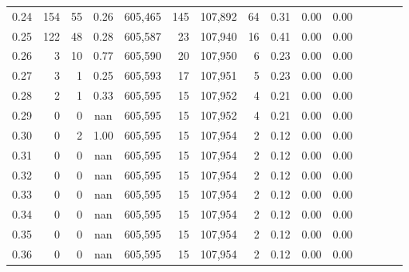 \begin{tabular}{rrrcrrrrrrrrrrr}
0.24 &      154 &      55 &                                       0.26 &  605,465 &      145 &  107,892 &       64 &  0.31 &  0.00 &                         0.00 \\
0.25 &      122 &      48 &                                       0.28 &  605,587 &       23 &  107,940 &       16 &  0.41 &  0.00 &                         0.00 \\
0.26 &        3 &      10 &                                       0.77 &  605,590 &       20 &  107,950 &        6 &  0.23 &  0.00 &                         0.00 \\
0.27 &        3 &       1 &                                       0.25 &  605,593 &       17 &  107,951 &        5 &  0.23 &  0.00 &                         0.00 \\
0.28 &        2 &       1 &                                       0.33 &  605,595 &       15 &  107,952 &        4 &  0.21 &  0.00 &                         0.00 \\
0.29 &        0 &       0 &                                        nan &  605,595 &       15 &  107,952 &        4 &  0.21 &  0.00 &                         0.00 \\
0.30 &        0 &       2 &                                       1.00 &  605,595 &       15 &  107,954 &        2 &  0.12 &  0.00 &                         0.00 \\
0.31 &        0 &       0 &                                        nan &  605,595 &       15 &  107,954 &        2 &  0.12 &  0.00 &                         0.00 \\
0.32 &        0 &       0 &                                        nan &  605,595 &       15 &  107,954 &        2 &  0.12 &  0.00 &                         0.00 \\
0.33 &        0 &       0 &                                        nan &  605,595 &       15 &  107,954 &        2 &  0.12 &  0.00 &                         0.00 \\
0.34 &        0 &       0 &                                        nan &  605,595 &       15 &  107,954 &        2 &  0.12 &  0.00 &                         0.00 \\
0.35 &        0 &       0 &                                        nan &  605,595 &       15 &  107,954 &        2 &  0.12 &  0.00 &                         0.00 \\
0.36 &        0 &       0 &                                        nan &  605,595 &       15 &  107,954 &        2 &  0.12 &  0.00 &                         0.00 \\

\end{tabular}
